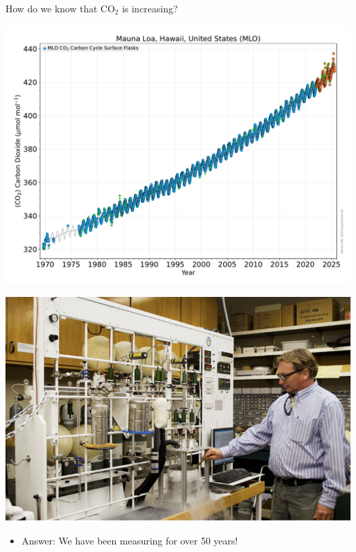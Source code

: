 \documentclass[12pt]{beamer}
\begin{document}
\begin{frame}{How do we know that $\text{CO}_2$ is increasing?}

\begin{center}
\begin{minipage}{0.62\textwidth}
\vspace{0pt}
\includegraphics[width=\textwidth]{images/mauna-loa-data_2025-09-01.pdf}
\end{minipage} %
\hfill %
\begin{minipage}{0.35\textwidth}
\vspace{0pt}
\includegraphics[width=\textwidth]{images/co2_bottling.png}
\end{minipage}
\end{center}
%


\begin{itemize}
\item Answer: We have been measuring for over 50 years!
\end{itemize}

\end{frame}
\end{document}
